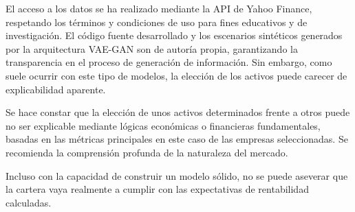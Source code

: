 El acceso a los datos se ha realizado mediante la API de Yahoo Finance, respetando los términos y condiciones de uso para fines educativos y de investigación. El código fuente desarrollado y los escenarios sintéticos generados por la arquitectura VAE-GAN son de autoría propia, garantizando la transparencia en el proceso de generación de información. Sin embargo, como suele ocurrir con este tipo de modelos, la elección de los activos puede carecer de explicabilidad aparente.

Se hace constar que la elección de unos activos determinados frente a otros puede no ser explicable mediante lógicas económicas o financieras fundamentales, basadas en las métricas principales en este caso de las empresas seleccionadas. Se recomienda la comprensión profunda de la naturaleza del mercado.

Incluso con la capacidad de construir un modelo sólido, no se puede aseverar que la cartera vaya realmente a cumplir con las expectativas de rentabilidad calculadas. 
